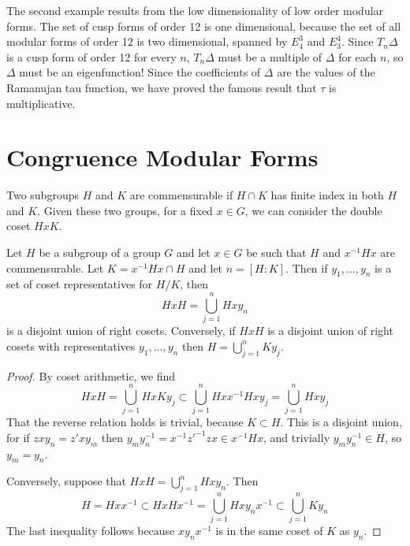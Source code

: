 The second example results from the low dimensionality of low order modular forms. The set of cusp forms of order 12 is one dimensional, because the set of all modular forms of order 12 is two dimensional, spanned by $E_4^3$ and $E_3^4$. Since $T_n \Delta$ is a cusp form of order 12 for every $n$, $T_n \Delta$ must be a multiple of $\Delta$ for each $n$, so $\Delta$ must be an eigenfunction! Since the coefficients of $\Delta$ are the values of the Ramanujan tau function, we have proved the famous result that $\tau$ is multiplicative.










\chapter{Congruence Modular Forms}

Two subgroups $H$ and $K$ are commensurable if $H \cap K$ has finite index in both $H$ and $K$. Given these two groups, for a fixed $x \in G$, we can consider the double coset $HxK$.

\begin{theorem}
    Let $H$ be a subgroup of a group $G$ and let $x \in G$ be such that $H$ and $x^{-1}Hx$ are commensurable. Let $K = x^{-1}Hx \cap H$ and let $n = [H:K]$. Then if $y_1, \dots, y_n$ is a set of coset representatives for $H/K$, then
    \[ H x H = \bigcup_{j = 1}^n H x y_n \]
    is a disjoint union of right cosets. Conversely, if $HxH$ is a disjoint union of right cosets with representatives $y_1, \dots, y_n$ then $H = \bigcup_{j = 1}^n K y_j$.
\end{theorem}
\begin{proof}
    By coset arithmetic, we find
    \[ HxH = \bigcup_{j = 1}^n HxKy_j \subset \bigcup_{j = 1}^n Hxx^{-1}Hxy_j = \bigcup_{j = 1}^n Hxy_j \]
    That the reverse relation holds is trivial, because $K \subset H$. This is a disjoint union, for if $zxy_n = z'xy_m$ then $y_my_n^{-1} = x^{-1}z'^{-1}zx \in x^{-1}Hx$, and trivially $y_my_n^{-1} \in H$, so $y_m = y_n$.

    Conversely, suppose that $HxH = \bigcup_{j = 1}^n Hxy_n$. Then
    \[ H = Hxx^{-1} \subset HxHx^{-1} = \bigcup_{j = 1}^n Hxy_nx^{-1} \subset \bigcup_{j = 1}^n Ky_n \]
    The last inequality follows because $xy_nx^{-1}$ is in the same coset of $K$ as $y_n$.
\end{proof}

